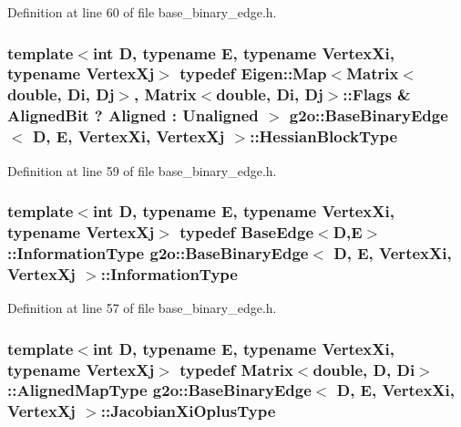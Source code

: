 Definition at line 60 of file base\+\_\+binary\+\_\+edge.\+h.

\subsubsection[{\texorpdfstring{Hessian\+Block\+Type}{HessianBlockType}}]{\setlength{\rightskip}{0pt plus 5cm}template$<$int D, typename E, typename Vertex\+Xi, typename Vertex\+Xj$>$ typedef Eigen\+::\+Map$<$Matrix$<$double, {\bf Di}, {\bf Dj}$>$, Matrix$<$double, {\bf Di}, {\bf Dj}$>$\+::Flags \& Aligned\+Bit ? Aligned \+: Unaligned $>$ {\bf g2o\+::\+Base\+Binary\+Edge}$<$ D, E, Vertex\+Xi, Vertex\+Xj $>$\+::{\bf Hessian\+Block\+Type}}\hypertarget{classg2o_1_1BaseBinaryEdge_a7eadbbe6abffe4d2ebdf6231272789a5}{}\label{classg2o_1_1BaseBinaryEdge_a7eadbbe6abffe4d2ebdf6231272789a5}


Definition at line 59 of file base\+\_\+binary\+\_\+edge.\+h.

\subsubsection[{\texorpdfstring{Information\+Type}{InformationType}}]{\setlength{\rightskip}{0pt plus 5cm}template$<$int D, typename E, typename Vertex\+Xi, typename Vertex\+Xj$>$ typedef {\bf Base\+Edge}$<$D,E$>$\+::{\bf Information\+Type} {\bf g2o\+::\+Base\+Binary\+Edge}$<$ D, E, Vertex\+Xi, Vertex\+Xj $>$\+::{\bf Information\+Type}}\hypertarget{classg2o_1_1BaseBinaryEdge_a4530ef6462aadaf2ab826d440d3b3318}{}\label{classg2o_1_1BaseBinaryEdge_a4530ef6462aadaf2ab826d440d3b3318}


Definition at line 57 of file base\+\_\+binary\+\_\+edge.\+h.

\subsubsection[{\texorpdfstring{Jacobian\+Xi\+Oplus\+Type}{JacobianXiOplusType}}]{\setlength{\rightskip}{0pt plus 5cm}template$<$int D, typename E, typename Vertex\+Xi, typename Vertex\+Xj$>$ typedef Matrix$<$double, D, {\bf Di}$>$\+::Aligned\+Map\+Type {\bf g2o\+::\+Base\+Binary\+Edge}$<$ D, E, Vertex\+Xi, Vertex\+Xj $>$\+::{\bf Jacobian\+Xi\+Oplus\+Type}}\hypertarget{classg2o_1_1BaseBinaryEdge_ab1cde84224b129603bcd95db027e0167}{}\label{classg2o_1_1BaseBinaryEdge_ab1cde84224b129603bcd95db027e0167}


